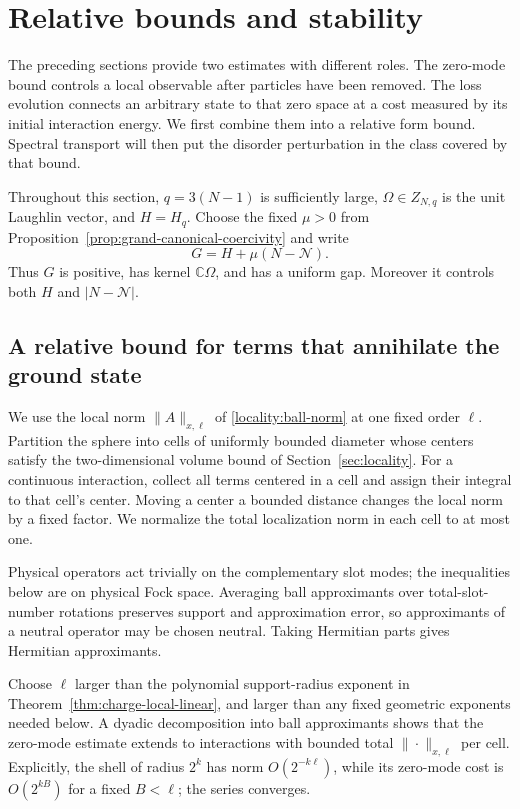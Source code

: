 \section{Relative bounds and stability}\label{sec:stability}

The preceding sections provide two estimates with different roles.
The zero-mode bound controls a local observable after particles have
been removed. The loss evolution connects an arbitrary state to that
zero space at a cost measured by its initial interaction energy.
We first combine them into a relative form bound. Spectral transport
will then put the disorder perturbation in the class covered by that
bound.

Throughout this section, $q=3(N-1)$ is sufficiently large,
$\Omega\in Z_{N,q}$ is the unit Laughlin vector, and $H=H_q$.
Choose the fixed $\mu>0$ from
Proposition~\ref{prop:grand-canonical-coercivity} and write
\begin{equation}\label{eq:stability-G}
 G=H+\mu(N-\mathcal N).
\end{equation}
Thus $G$ is positive, has kernel $\mathbb C\Omega$, and has a uniform
gap. Moreover it controls both $H$ and $|N-\mathcal N|$.

\subsection{A relative bound for terms that annihilate the ground state}

We use the local norm $\|A\|_{x,\ell}$ of
\eqref{locality:ball-norm} at one fixed order $\ell$.
Partition the sphere into cells of uniformly bounded diameter whose
centers satisfy the two-dimensional volume bound of
Section~\ref{sec:locality}. For a continuous interaction, collect
all terms centered in a cell and assign their integral to that cell's
center. Moving a center a bounded distance changes the local norm by
a fixed factor. We normalize the total localization norm in each cell
to at most one.

Physical operators act trivially on the complementary slot modes;
the inequalities below are on physical Fock space. Averaging ball
approximants over total-slot-number rotations preserves support and
approximation error, so approximants of a neutral operator may be
chosen neutral. Taking Hermitian parts gives Hermitian approximants.

Choose $\ell$ larger than the polynomial support-radius exponent in
Theorem~\ref{thm:charge-local-linear}, and larger than any fixed
geometric exponents needed below. A dyadic decomposition into ball
approximants shows that the zero-mode estimate extends to interactions
with bounded total $\|\cdot\|_{x,\ell}$ per cell. Explicitly, the
shell of radius $2^k$ has norm $O(2^{-k\ell})$, while its zero-mode
cost is $O(2^{kB})$ for a fixed $B<\ell$; the series converges.

